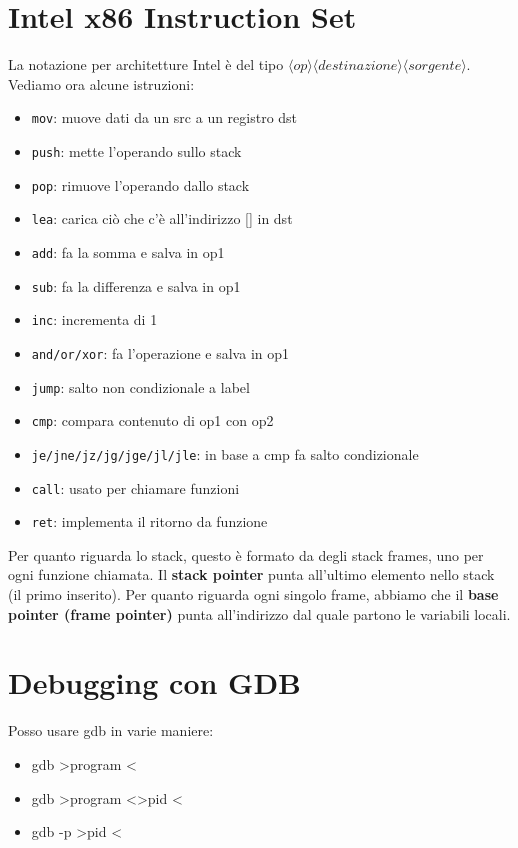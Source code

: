 \documentclass[oneside,a4paper,11pt]{book}
\theoremstyle{italicstyle}
\theoremstyle{normStyle}
\begin{document}
\section{Intel x86 Instruction Set}
La notazione per architetture Intel è del tipo $\langle op\rangle \langle
destinazione\rangle\langle sorgente\rangle$. Vediamo ora alcune istruzioni:
\begin{itemize}
\item \texttt{mov}: muove dati da un src a un registro dst
\item \texttt{push}: mette l'operando sullo stack
\item \texttt{pop}: rimuove l'operando dallo stack
\item \texttt{lea}: carica ciò che c'è all'indirizzo [] in dst
\item \texttt{add}: fa la somma e salva in op1
\item \texttt{sub}: fa la differenza e salva in op1
\item \texttt{inc}: incrementa di 1
\item \texttt{and/or/xor}: fa l'operazione e salva in op1
\item \texttt{jump}: salto non condizionale a label
\item \texttt{cmp}: compara contenuto di op1 con op2
\item \texttt{je/jne/jz/jg/jge/jl/jle}: in base a cmp fa salto condizionale 
\item \texttt{call}: usato per chiamare funzioni
\item \texttt{ret}: implementa il ritorno da funzione
\end{itemize}

Per quanto riguarda lo stack, questo è formato da degli stack frames, uno per ogni funzione chiamata. Il \textbf{stack pointer} punta all'ultimo elemento nello stack (il primo inserito). Per quanto riguarda ogni singolo frame, abbiamo che il \textbf{base pointer (frame pointer)} punta all'indirizzo dal quale partono le variabili locali.

\section{Debugging con GDB}
Posso usare gdb in varie maniere:
\begin{itemize}
\item gdb \textgreater program \textless
\item gdb \textgreater program \textless \textgreater pid \textless 
\item gdb  -p \textgreater pid \textless
\end{itemize}
\end{document}
